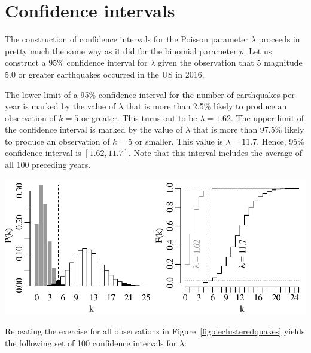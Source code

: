 \section{Confidence intervals}
\label{sec:poisCI}

The construction of confidence intervals for the Poisson parameter
$\lambda$ proceeds in pretty much the same way as it did for the
binomial parameter $p$. Let us construct a 95\% confidence interval
for $\lambda$ given the observation that 5 magnitude 5.0 or greater
earthquakes occurred in the US in 2016.\medskip

The lower limit of a 95\% confidence interval for the number of
earthquakes per year is marked by the value of $\lambda$ that is more
than 2.5\% likely to produce an observation of $k=5$ or greater. This
turns out to be $\lambda=1.62$. The upper limit of the confidence
interval is marked by the value of $\lambda$ that is more than 97.5\%
likely to produce an observation of $k=5$ or smaller. This value is
$\lambda=11.7$. Hence, 95\% confidence interval is $[1.62, 11.7]$.
Note that this interval includes the average of all 100 preceding
years. \medskip

\noindent\begin{minipage}[t][][b]{.6\textwidth}
  \includegraphics[width=\textwidth]{../figures/poisci.pdf}\medskip
\end{minipage}
\begin{minipage}[t][][t]{.4\textwidth}
  \label{fig:poisci}
\end{minipage}

Repeating the exercise for all observations in
Figure~\ref{fig:declusteredquakes} yields the following set of 100
confidence intervals for $\lambda$:\medskip

